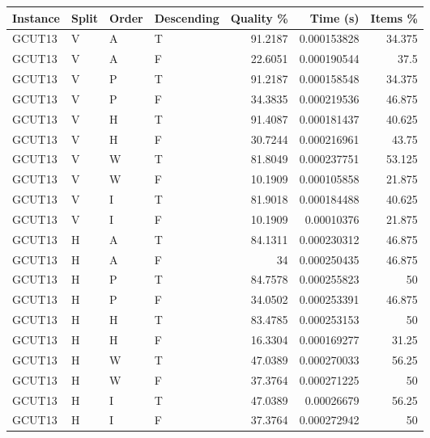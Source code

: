 \begin{tabular}{llllrrr}
    \hline
    Instance & Split & Order & Descending & Quality \% & Time (s)    & Items \% \\
    \hline
    GCUT13   & V     & A     & T          & 91.2187    & 0.000153828 & 34.375   \\
    GCUT13   & V     & A     & F          & 22.6051    & 0.000190544 & 37.5     \\
    GCUT13   & V     & P     & T          & 91.2187    & 0.000158548 & 34.375   \\
    GCUT13   & V     & P     & F          & 34.3835    & 0.000219536 & 46.875   \\
    GCUT13   & V     & H     & T          & 91.4087    & 0.000181437 & 40.625   \\
    GCUT13   & V     & H     & F          & 30.7244    & 0.000216961 & 43.75    \\
    GCUT13   & V     & W     & T          & 81.8049    & 0.000237751 & 53.125   \\
    GCUT13   & V     & W     & F          & 10.1909    & 0.000105858 & 21.875   \\
    GCUT13   & V     & I     & T          & 81.9018    & 0.000184488 & 40.625   \\
    GCUT13   & V     & I     & F          & 10.1909    & 0.00010376  & 21.875   \\
    GCUT13   & H     & A     & T          & 84.1311    & 0.000230312 & 46.875   \\
    GCUT13   & H     & A     & F          & 34         & 0.000250435 & 46.875   \\
    GCUT13   & H     & P     & T          & 84.7578    & 0.000255823 & 50       \\
    GCUT13   & H     & P     & F          & 34.0502    & 0.000253391 & 46.875   \\
    GCUT13   & H     & H     & T          & 83.4785    & 0.000253153 & 50       \\
    GCUT13   & H     & H     & F          & 16.3304    & 0.000169277 & 31.25    \\
    GCUT13   & H     & W     & T          & 47.0389    & 0.000270033 & 56.25    \\
    GCUT13   & H     & W     & F          & 37.3764    & 0.000271225 & 50       \\
    GCUT13   & H     & I     & T          & 47.0389    & 0.00026679  & 56.25    \\
    GCUT13   & H     & I     & F          & 37.3764    & 0.000272942 & 50       \\

\end{tabular}
